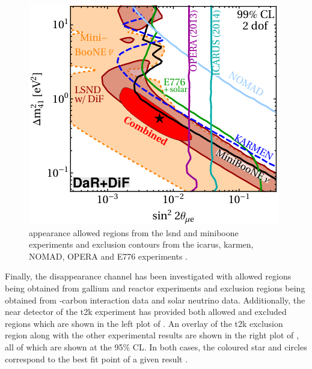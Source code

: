 \begin{figure}[!h]
    \centering
    \includegraphics[width = \largefigwidth]{figures-chap6/external_limits/nue_app_combo.png}
    \caption[\nue appearance limits from the \gls{lsnd}, \gls{miniboone}, \gls{icarus}, \gls{karmen}, NOMAD, OPERA and E776 experiments.]{\nue appearance allowed regions from the \gls{lsnd} and \gls{miniboone} experiments and exclusion contours from the \gls{icarus}, \gls{karmen}, NOMAD, OPERA and E776 experiments \cite{LSND_KARMEN_nue_app_contour}.}
    \label{fig:nue_app_external}
\end{figure}

Finally, the \nue disappearance channel has been investigated with allowed regions being obtained from gallium and reactor experiments and exclusion regions being obtained from \nue-carbon interaction data and solar neutrino data. Additionally, the near detector of the \gls{t2k} experiment has provided both allowed and excluded regions which are shown in the left plot of . An overlay of the \gls{t2k} exclusion region along with the other experimental results are shown in the right plot of , all of which are shown at the 95\% CL. In both cases, the coloured star and circles correspond to the best fit point of a given result \cite{T2K_nue_disapp_contour}. 

